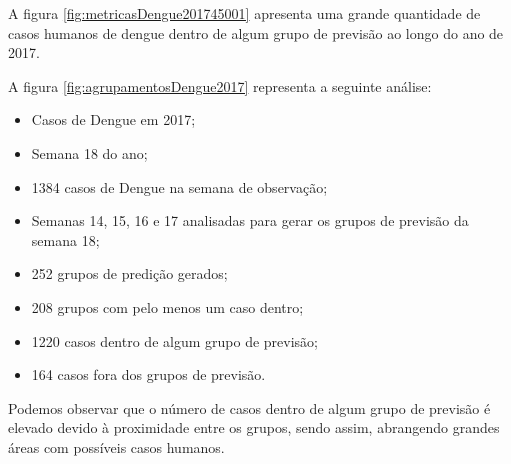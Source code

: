A figura \ref{fig:metricasDengue201745001} apresenta uma grande quantidade de casos humanos de dengue dentro de algum grupo de previsão ao longo do ano de 2017.
\begin{figure}[!ht]
	\centering	
\end{figure}
\FloatBarrier

A figura \ref{fig:agrupamentosDengue2017} representa a seguinte análise:
\begin{itemize}
    \item Casos de Dengue em 2017;
    \item Semana 18 do ano;
    \item 1384 casos de Dengue na semana de observação;
    \item Semanas  14, 15, 16 e 17 analisadas para gerar os grupos de previsão da semana 18;
    \item 252 grupos de predição gerados;
    \item 208 grupos com pelo menos um caso dentro;
    \item 1220 casos dentro de algum grupo de previsão;
    \item 164 casos fora dos grupos de previsão.
\end{itemize}

Podemos observar que o número de casos dentro de algum grupo de previsão é elevado devido à proximidade entre os grupos, sendo assim, abrangendo grandes áreas com possíveis casos humanos.

